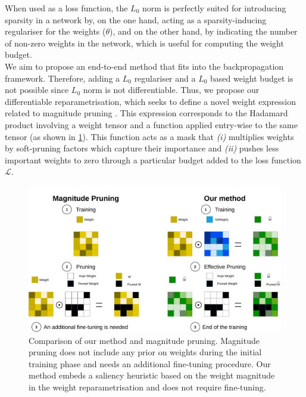 When used as a loss function, the $L_0$ norm is perfectly suited for introducing
sparsity in a network by, on the one hand, acting as a sparsity-inducing
regulariser for the weights ($\theta$), and on the other hand, by indicating the number of
non-zero weights in the network, which is useful for computing the weight
budget. \\

We aim to propose an end-to-end method that fits into the backpropagation
framework. Therefore, adding a $L_0$ regulariser and a $L_0$ based weight budget
is not possible since $L_0$ norm is not differentiable. Thus, we propose our
differentiable reparametrisation, which seeks to define a novel weight
expression related to magnitude pruning
\cite{DBLP:conf/nips/CunDS89,DBLP:conf/nips/HanPTD15}. This expression
corresponds to the Hadamard product involving a weight tensor and a function
applied entry-wise to the same tensor (as shown in
\cref{fig:chap1:comparison_reparam_vs_mag_pruning}). This function acts as a
mask that \emph{(i)} multiplies weights by soft-pruning factors which capture their
importance and \emph{(ii)} pushes less important weights to zero through a particular
budget added to the loss function $\mathcal{L}$. \\

\begin{figure}[ht]
    \centerline{\includegraphics[width=12.5cm]{chapter_1/assets/comparison_reparam_vs_mag_pruning.pdf}}
  \caption{Comparison of our method and magnitude pruning. Magnitude pruning
  does not include any prior on weights during the initial training phase
  and needs an additional fine-tuning procedure. Our method embeds a saliency
  heuristic based on the weight magnitude in the weight reparametrisation and
  does not require fine-tuning.}
  \label{fig:chap1:comparison_reparam_vs_mag_pruning}
\end{figure}


